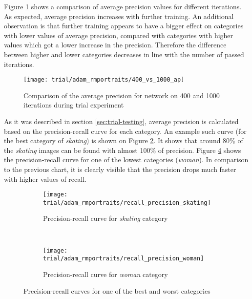     Figure \ref{fig:trial-400-vs-1000} shows a comparison of average precision values for different iterations. As expected, average precision increases with further training. An additional observation is that further training appears to have a bigger effect on categories with lower values of average precision, compared with categories with higher values which got a lower increase in the precision. Therefore the difference between higher and lower categories decreases in line with the number of passed iterations.
    
    \begin{figure}[H]
        \centering
        \texttt{[image: trial/adam\_rmportraits/400\_vs\_1000\_ap]}
        \caption{Comparison of the average precision for network on 400 and 1000 iterations during trial experiment}
        \label{fig:trial-400-vs-1000}
    \end{figure}
    
    As it was described in section \ref{sec:trial-testing}, average precision is calculated based on the precision-recall curve for each category. An example such curve (for the best category of \textit{skating}) is shown on Figure \ref{fig:trial-precision-recall-skating}. It shows that around 80\% of the \textit{skating} images can be found with almost 100\% of precision. Figure \ref{fig:trial-precision-recall-woman} shows the precision-recall curve for one of the lowest categories (\textit{woman}). In comparison to the previous chart, it is clearly visible that the precision drops much faster with higher values of recall.
    
    \begin{figure}[H]
    \centering
    \begin{subfigure}[a]{0.9\textwidth}
        \texttt{[image: trial/adam\_rmportraits/recall\_precision\_skating]}
        \caption{Precision-recall curve for \textit{skating} category}
        \label{fig:trial-precision-recall-skating}
    \end{subfigure}
    \\
    \begin{subfigure}[a]{0.9\textwidth}
        \texttt{[image: trial/adam\_rmportraits/recall\_precision\_woman]}
        \caption{Precision-recall curve for \textit{woman} category}
        \label{fig:trial-precision-recall-woman}
    \end{subfigure}
    \caption{Precision-recall curves for one of the best and worst categories}
    \end{figure}
    

